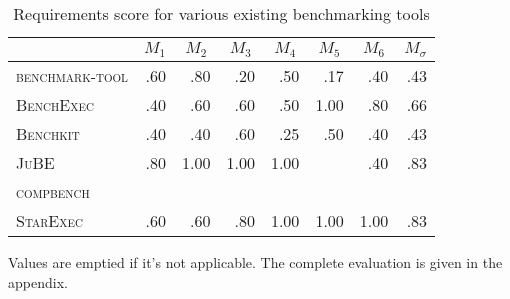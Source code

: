 \begin{table}
    \begin{threeparttable}
        \begin{adjustbox}{max width=\textwidth}
            \begin{tabular}{lddddddd}
                \toprule

                                              &  &  &  &  &  &  &  \\
                \midrule
                \textsc{benchmark-tool}       & .60                       & .80                       & .20                       & .50                       & .17                       & .40                       & .43                            \\
                \textsc{BenchExec}            & .40                       & .60                       & .60                       & .50                       & 1.00                      & .80                       & .66                            \\
                \textsc{Benchkit}             & .40                       & .40                       & .60                       & .25                       & .50                       & .40                       & .43                            \\
                \textsc{JuBE}                 & .80                       & 1.00                      & 1.00                      & 1.00                      &                           & .40                       & .83                            \\
                \textsc{compbench} \\ %
                \textsc{StarExec}             & .60                       & .60                       & .80                       & 1.00                      & 1.00                      & 1.00                      & .83                            \\
                \bottomrule
            \end{tabular}
        \end{adjustbox}
        \begin{tablenotes}
            \footnotesize
            \note Values are emptied if it's not applicable. The complete evaluation is given in the appendix.
        \end{tablenotes}
        \caption{Requirements score for various existing benchmarking tools}
        \label{tab:reqscoresummary}
    \end{threeparttable}
\end{table}

